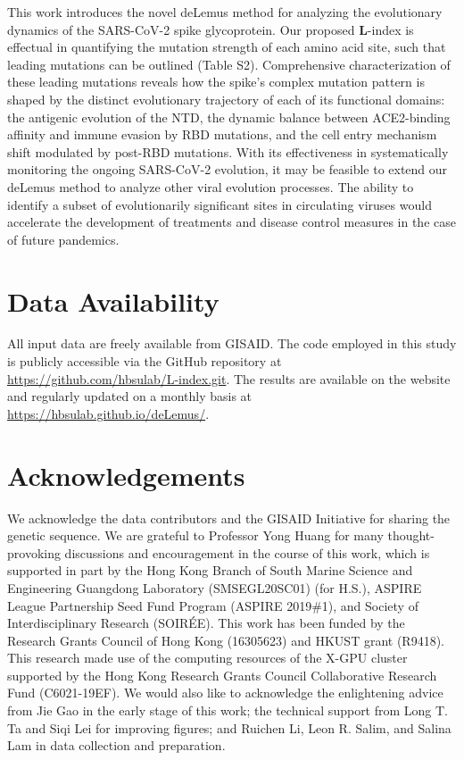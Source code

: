 \documentclass[aps,prl,amsmath,amssymb,floatfix,twocolumn, amsmath, superscriptaddress, onecolumn]{revtex4}
\begin{document}
This work introduces the novel deLemus method for analyzing the evolutionary dynamics of the SARS-CoV-2 spike glycoprotein. Our proposed $\bm{L}$-index is effectual in quantifying the mutation strength of each amino acid site, such that leading mutations can be outlined (Table S2). Comprehensive characterization of these leading mutations reveals how the spike’s complex mutation pattern is shaped by the distinct evolutionary trajectory of each of its functional domains: the antigenic evolution of the NTD, the dynamic balance between ACE2-binding affinity and immune evasion by RBD mutations, and the cell entry mechanism shift modulated by post-RBD mutations. With its effectiveness in systematically monitoring the ongoing SARS-CoV-2 evolution, it may be feasible to extend our deLemus method to analyze other viral evolution processes. The ability to identify a subset of evolutionarily significant sites in circulating viruses would accelerate the development of treatments and disease control measures in the case of future pandemics.

\section{Data Availability}

All input data are freely available from GISAID. The code employed in this study is publicly accessible via the GitHub repository at \href{https://github.com/hbsulab/L-index.git}{https://github.com/hbsulab/L-index.git}. The results are available on the website and regularly updated on a monthly basis at \href{https://hbsulab.github.io/deLemus/}{https://hbsulab.github.io/deLemus/}. 

\section{Acknowledgements}
We acknowledge the data contributors and the GISAID Initiative for sharing the genetic sequence. We are grateful to Professor Yong Huang for many thought-provoking discussions and encouragement in the course of this work, which is supported in part by the Hong Kong Branch of South Marine Science and Engineering Guangdong Laboratory (SMSEGL20SC01) (for H.S.), ASPIRE League Partnership Seed Fund Program (ASPIRE 2019\#1), and Society of Interdisciplinary Research (SOIRÉE). This work has been funded by the Research Grants Council of Hong Kong (16305623) and HKUST grant (R9418). This research made use of the computing resources of the X-GPU cluster supported by the Hong Kong Research Grants Council Collaborative Research Fund (C6021-19EF). We would also like to acknowledge the enlightening advice from Jie Gao in the early stage of this work; the technical support from Long T. Ta and Siqi Lei for improving figures; and Ruichen Li, Leon R. Salim, and Salina Lam in data collection and preparation.

\newpage
\pagestyle{fancy}
\rhead{\thepage}
\lhead{}
\cfoot{}
\renewcommand{\headrulewidth}{0pt}
\printbibliography
\end{document}
